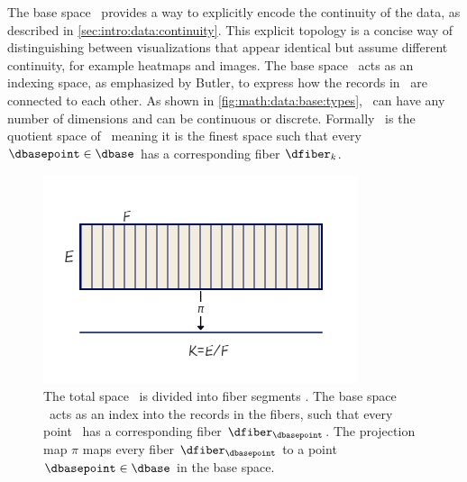 \documentclass[../main.tex]{subfiles}
\begin{document}
The base space \dbase\ provides a way to explicitly encode the continuity of the data, as described in \autoref{sec:intro:data:continuity}. This explicit topology is a concise way of distinguishing between visualizations that appear identical but assume different continuity, for example heatmaps and images. The base space \dbase\ acts as an indexing space, as emphasized by Butler\cite{butlerVectorBundleClassesForm1992,butlerVisualizationModelBased1989}, to express how the records in \dtotal\ are connected to each other. As shown in \autoref{fig:math:data:base:types}, \dbase\ can have any number of dimensions and can be continuous or discrete. Formally \dbase\ is the quotient space \cite{QuotientSpaceTopology2020} of \dtotal\, meaning it is the finest space\cite{aurouxMath131Introduction} such that every $\dbasepoint \in \dbase$ has a corresponding fiber $\dfiber_k$\cite{QuotientSpaceTopology2020}. 

\begin{figure}[H]
    \includegraphics[width=\linewidth]{figures/math/k_qspace.png}
    \caption{The total space \dtotal\ is divided into fiber segments \dfiber. The base space \dbase\ acts as an index into the records in the fibers, such that every point \dbasepoint\ has a corresponding fiber $\dfiber_{\dbasepoint}$. The projection map $\pi$ maps every fiber $\dfiber_{\dbasepoint}$ to a point $\dbasepoint \in \dbase$ in the base space.}
    \label{fig:math:data:base:div}
\end{figure}
\end{document}
